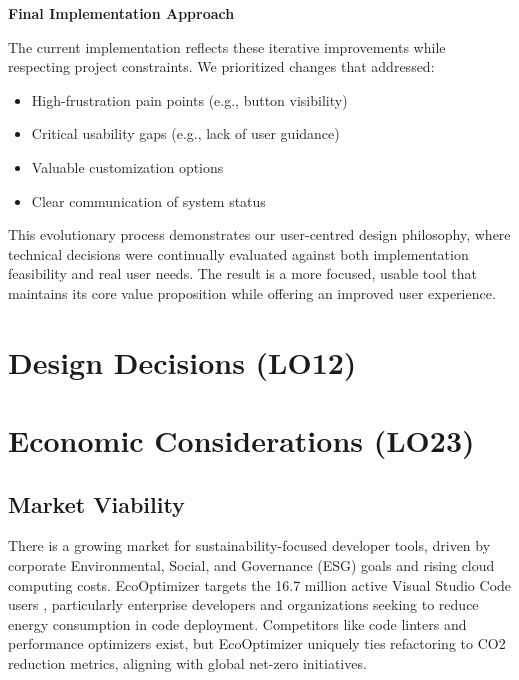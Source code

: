 \documentclass{article}
\begin{document}
\noindent \textbf{Final Implementation Approach}

\noindent
The current implementation reflects these iterative improvements while respecting project constraints. We prioritized changes that addressed:
\begin{itemize}
    \item High-frustration pain points (e.g., button visibility)
    \item Critical usability gaps (e.g., lack of user guidance)
    \item Valuable customization options
    \item Clear communication of system status
\end{itemize}

This evolutionary process demonstrates our user-centred design philosophy, where technical decisions were continually evaluated against both implementation feasibility and real user needs. The result is a more focused, usable tool that maintains its core value proposition while offering an improved user experience.


\section{Design Decisions (LO12)}


\section{Economic Considerations (LO23)}



\subsection{Market Viability}
There is a growing market for sustainability-focused developer tools, 
driven by corporate Environmental, Social, and Governance (ESG) goals 
and rising cloud computing costs. EcoOptimizer targets the 16.7 million 
active Visual Studio Code users \cite{vscodeUsers}, 
particularly enterprise developers and organizations seeking to reduce 
energy consumption in code deployment. Competitors like code linters and 
performance optimizers exist, but EcoOptimizer 
uniquely ties refactoring 
to CO2 reduction metrics, aligning with global net-zero initiatives.
\end{document}
